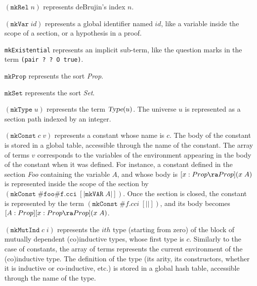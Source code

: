 \begin{description}
    {$(\texttt{mkRel}\;n)$ represents deBrujin's index $n$.}

    {$(\texttt{mkVar}\;id)$
    represents a global identifier named $id$, like a variable
    inside the scope of a section, or a hypothesis in a proof}.

   {\texttt{mkExistential} represents an implicit sub-term, like the question
    marks in the term \texttt{(pair ? ? O true)}.}


    {$\texttt{mkProp}$ represents the sort \textsl{Prop}.}

    {$\texttt{mkSet}$ represents the sort \textsl{Set}.}

    {$(\texttt{mkType}\;u)$ represents the term
    $\textsl{Type}(u)$. The universe $u$ is represented as a 
    section path indexed by an integer. }

    {$(\texttt{mkConst}\;c\;v)$ represents a constant whose name is
    $c$. The body of the constant is stored in a global table,
    accessible through the name of the constant. The array of terms
    $v$ corresponds to the variables of the environment appearing in
    the body of the constant when it was defined. For instance, a
    constant defined in the section \textsl{Foo} containing the
    variable $A$, and whose body is $[x:Prop\ra Prop](x\;A)$ is
    represented inside the scope of the section by
    $(\texttt{mkConst}\;\texttt{\#foo\#f.cci}\;[| \texttt{mkVAR}\;A
    |])$.  Once the section is closed, the constant is represented by
    the term $(\texttt{mkConst}\;\#f.cci\;[| |])$, and its body
    becomes $[A:Prop][x:Prop\ra Prop](x\;A)$}.

    {$(\texttt{mkMutInd}\;c\;i)$ represents the $ith$ type
    (starting from zero) of the block of mutually dependent
    (co)inductive types, whose first type is $c$.  Similarly to the
    case of constants, the array of terms represents the current
    environment of the (co)inductive type. The definition of the type
    (its arity, its constructors, whether it is inductive or co-inductive, etc.)
    is stored in a global hash table, accessible through the name of 
    the type.}


\end{description}
